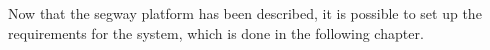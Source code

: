 
Now that the segway platform has been described, it is possible to set up the requirements for the system, which is done in the following chapter.





%
%
%
%
%
%
%
